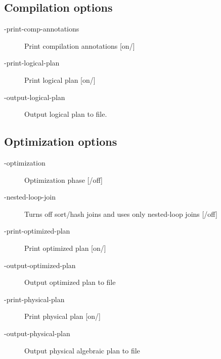\subsection{Compilation options}
\begin{description}
\item[-print-comp-annotations]  Print compilation annotations [on/]
\item[-print-logical-plan]  Print logical plan [on/]
\item[-output-logical-plan]  Output logical plan to file.
\end{description}

\subsection{Optimization options}
\begin{description}
\item[-optimization] Optimization phase [/off]
\item[-nested-loop-join] Turns off sort/hash joins and uses only nested-loop joins [/off]


\item[-print-optimized-plan]  Print optimized plan [on/]
\item[-output-optimized-plan]  Output optimized plan to file

\item[-print-physical-plan]  Print physical plan [on/]
\item[-output-physical-plan]  Output physical algebraic plan to file

\end{description}

